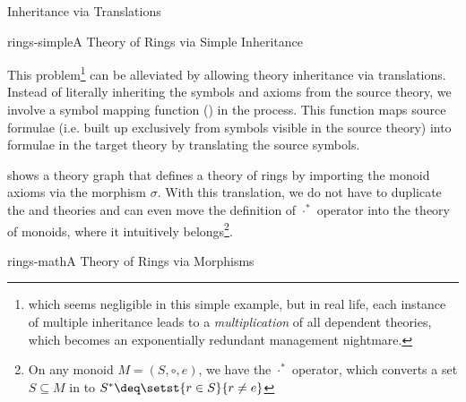 \begin{omgroup}[id=complex-theories,short=Complex Theories,
                            creators=miko,contributors=frabe]
\begin{omgroup}[id=morphisms]{Inheritance via Translations}
\begin{module}[id=morphisms]
\begin{myfig}{rings-simple}{A Theory of Rings via Simple Inheritance}
\end{myfig}
  
This problem\footnote{which seems negligible in this simple example, but in real life,
  each instance of multiple inheritance leads to a {\emph{multiplication}} of all
  dependent theories, which becomes an exponentially redundant management nightmare.} can
be alleviated by allowing theory inheritance via translations.  Instead of literally
inheriting the symbols and axioms from the source theory, we involve a symbol mapping
function () in the process. This function
maps source formulae (i.e. built up exclusively from symbols visible in the source theory)
into formulae in the target theory by translating the source symbols.
  
{} shows a theory graph that defines a theory of rings by importing
the monoid axioms via the morphism $\sigma$. With this translation, we do not have to
duplicate the {} and {} theories and can even move the
definition of $\cdot^*$ operator into the theory of monoids, where it intuitively
belongs\footnote{On any monoid $M=(S,\circ,e)$, we have the $\cdot^*$ operator, which
  converts a set $S\subseteq M$ in to $S^*\deq\setst{r\in S}{r\ne e}$}.

\begin{myfig}{rings-math}{A Theory of Rings via Morphisms}
\end{myfig}
\end{module}
\end{omgroup}
\end{omgroup}
